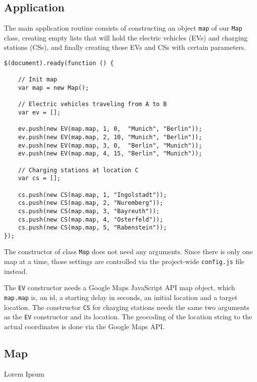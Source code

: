 \subsection{Application}

The main application routine consists of constructing an object \texttt{map} of our \texttt{Map} class, creating empty lists that will hold the electric vehicles (EVs) and charging stations (CSs), and finally creating those EVs and CSs with certain parameters.

\begin{verbatim}
$(document).ready(function () {

    // Init map
    var map = new Map();

    // Electric vehicles traveling from A to B
    var ev = [];

    ev.push(new EV(map.map, 1, 0,  "Munich", "Berlin"));
    ev.push(new EV(map.map, 2, 10, "Munich", "Berlin"));
    ev.push(new EV(map.map, 3, 0,  "Berlin", "Munich"));
    ev.push(new EV(map.map, 4, 15, "Berlin", "Munich"));

    // Charging stations at location C
    var cs = [];

    cs.push(new CS(map.map, 1, "Ingolstadt"));
    cs.push(new CS(map.map, 2, "Nuremberg"));
    cs.push(new CS(map.map, 3, "Bayreuth"));
    cs.push(new CS(map.map, 4, "Osterfeld"));
    cs.push(new CS(map.map, 5, "Rabenstein"));
});
\end{verbatim}

The constructor of class \texttt{Map} does not need any arguments. Since there is only one map at a time, those settings are controlled via the project-wide \texttt{config.js} file instead.

The \texttt{EV} constructor needs a Google Maps JavaScript API map object, which \texttt{map.map} is, an id, a starting delay in seconds, an initial location and a target location. The constructor \texttt{CS} for charging stations needs the same two arguments as the \texttt{EV} constructor and its location. The geocoding of the location string to the actual coordinates is done via the Google Maps API.


\subsection{Map}

Lorem Ipsum

